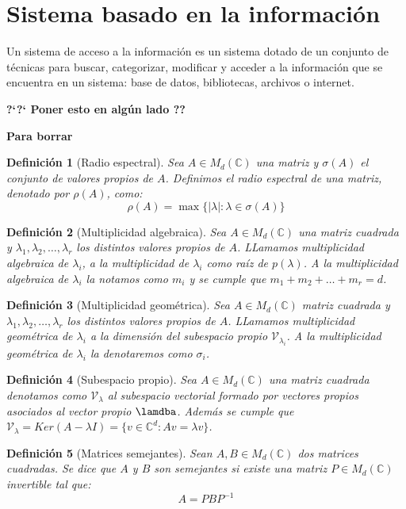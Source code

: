 \documentclass[size=a4, parskip=half, titlepage=false, toc=flat, toc=bib, 12pt]{scrartcl}
\theoremstyle{theorem-style}
\theoremstyle{definition-style}
\newtheorem{ndef}{Definición}[section]
\theoremstyle{remark-style}
\theoremstyle{example-style}
\theoremstyle{definition-style}
\theoremstyle{remark-style}
\begin{document}
\section{Sistema basado en la información}
Un sistema de acceso a la información es un sistema dotado de un conjunto de técnicas para buscar, categorizar, modificar y acceder a la información que se encuentra en un sistema: base de datos, bibliotecas, archivos o internet.

\textbf{?`?` Poner esto en algún lado ??}

\textbf{Para borrar}
\begin{ndef}[Radio espectral]
Sea $A \in M_d(\mathbb{C})$ una matriz y $\sigma (A)$ el conjunto de valores propios de $A$. Definimos el radio espectral de una matriz, denotado por $\rho(A)$,  como:
$$\rho(A) = \max \{ | \lambda| : \lambda \in \sigma (A) \} $$
\end{ndef}

\begin{ndef}[Multiplicidad algebraica]
Sea $A \in M_d(\mathbb{C})$ una matriz cuadrada y $\lambda_1, \lambda_2, \dots, \lambda_r$ los distintos valores propios de $A$. LLamamos multiplicidad algebraica de $\lambda_i$, a la multiplicidad de $\lambda_i$ como raíz de $p(\lambda)$. A la multiplicidad algebraica de $\lambda_i$ la notamos como $m_i$ y se cumple que $m_1 + m_2 + \dots + m_r = d$.
\end{ndef}

\begin{ndef}[Multiplicidad geométrica]
Sea $A \in M_d(\mathbb{C})$ matriz cuadrada y $\lambda_1, \lambda_2, \dots, \lambda_r$ los distintos valores propios de $A$. LLamamos multiplicidad geométrica de $\lambda_i$ a la dimensión del subespacio propio $\mathscr{V}_\lambda_i$. A la multiplicidad geométrica de $\lambda_i$ la denotaremos como $\sigma_i$.
\end{ndef}

\begin{ndef}[Subespacio propio]
Sea $A \in M_d(\mathbb{C})$ una matriz cuadrada denotamos como $\mathscr{V}_\lambda$ al subespacio vectorial formado por vectores propios asociados al vector propio $\lamdba$. Además se cumple que  $\mathscr{V}_\lambda = Ker(A - \lambda I) = \{ v \in \mathbb{C}^d : Av = \lambda v \}$.
\end{ndef}

\begin{ndef}[Matrices semejantes]
Sean $A, B \in M_d(\mathbb{C})$ dos matrices cuadradas. Se dice que $A$ y $B$ son semejantes si existe una matriz $P \in M_d(\mathbb{C})$ invertible tal que:
$$A = P B P^{-1} $$
\end{ndef}
\end{document}
